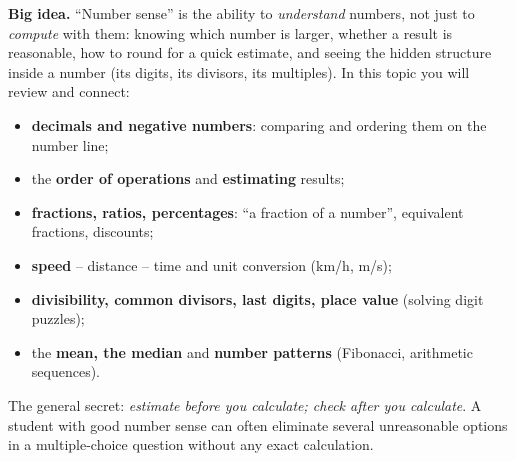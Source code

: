 \documentclass[11pt]{article}
\begin{document}
\begin{knowbox}
\textbf{Big idea.} ``Number sense'' is the ability to \emph{understand} numbers, not just to \emph{compute} with them:
knowing which number is larger, whether a result is reasonable, how to round for a quick estimate, and seeing the
hidden structure inside a number (its digits, its divisors, its multiples). In this topic you will review and connect:
\begin{itemize}[leftmargin=1.4em,itemsep=1pt,topsep=2pt]
  \item \textbf{decimals and negative numbers}: comparing and ordering them on the number line;
  \item the \textbf{order of operations} and \textbf{estimating} results;
  \item \textbf{fractions, ratios, percentages}: ``a fraction of a number'', equivalent fractions, discounts;
  \item \textbf{speed} -- distance -- time and unit conversion (km/h, m/s);
  \item \textbf{divisibility, common divisors, last digits, place value} (solving digit puzzles);
  \item the \textbf{mean, the median} and \textbf{number patterns} (Fibonacci, arithmetic sequences).
\end{itemize}
The general secret: \emph{estimate before you calculate; check after you calculate}. A student with good number
sense can often eliminate several unreasonable options in a multiple-choice question without any exact calculation.
\end{knowbox}
\vspace{0.3cm}
\end{document}
